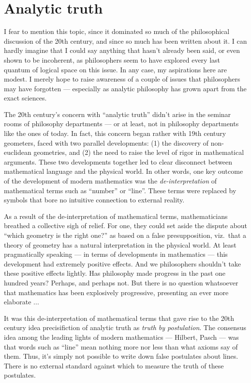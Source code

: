 \section{Analytic truth} %

I fear to mention this topic, since it dominated so much of the
philosophical discussion of the 20th century, and since so much has
been written about it.  I can hardly imagine that I could say anything
that hasn't already been said, or even shown to be incoherent, as
philosophers seem to have explored every last quantum of logical space
on this issue.  In any case, my aspirations here are modest.  I merely
hope to raise awareness of a couple of issues that philosophers may
have forgotten --- especially as analytic philosophy has grown apart
from the exact sciences.

The 20th century's concern with ``analytic truth'' didn't arise in the
seminar rooms of philosophy departments --- or at least, not in
philosophy departments like the ones of today.  In fact, this concern
began rather with 19th century geometers, faced with two parallel
developments: (1) the discovery of non-euclidean geometries, and (2)
the need to raise the level of rigor in mathematical arguments.  These
two developments together led to clear disconnect between mathematical
language and the physical world.  In other words, one key outcome of
the development of modern mathematics was the {\it de-interpretation}
of mathematical terms such as ``number'' or ``line''.  These terms
were replaced by symbols that bore no intuitive connection to external
reality.

As a result of the de-interpretation of mathematical terms,
mathematicians breathed a collective sigh of relief.  For one, they
could set aside the dispute about ``which geometry is the right one?''
as based on a false presupposition, viz.\ that a theory of geometry
has a natural interpretation in the physical world.  At least
pragmatically speaking --- in terms of developments in mathematics ---
this development had extremely positive effects.  And we philosophers
shouldn't take these positive effects lightly.  Has philosophy made
progress in the past one hundred years?  Perhaps, and perhaps not.
But there is no question whatsoever that mathematics has been
explosively progressive, presenting an ever more elaborate ...

It was this de-interpretation of mathematical terms that gave rise to
the 20th century idea precisifiction of analytic truth as {\it truth
  by postulation}.  The consensus idea among the leading lights of
modern mathematics --- Hilbert, Pasch --- was that words such as
``line'' mean nothing more nor less than what axioms say of them.
Thus, it's simply not possible to write down false postulates about
lines.  There is no external standard against which to measure the
truth of these postulates.

